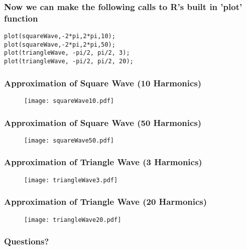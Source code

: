 \documentclass{beamer}
\begin{document}
\begin{frame}[fragile]
   \frametitle{Now we can make the following calls to R's built in 'plot' function}
   \begin{center}
   \begin{minipage}{100mm}
   \begin{lstlisting}
plot(squareWave,-2*pi,2*pi,10);
plot(squareWave,-2*pi,2*pi,50);
plot(triangleWave, -pi/2, pi/2, 3);
plot(triangleWave, -pi/2, pi/2, 20);
   \end{lstlisting}
   \end{minipage}
   \end{center}
\end{frame}

\begin{frame}[fragile]
   \frametitle{Approximation of Square Wave (10 Harmonics)}
   \begin{figure}
   \texttt{[image: squareWave10.pdf]}
   \end{figure}
\end{frame}

\begin{frame}[fragile]
   \frametitle{Approximation of Square Wave (50 Harmonics)}
   \begin{figure}
   \texttt{[image: squareWave50.pdf]}
   \end{figure}
\end{frame}

\begin{frame}[fragile]
   \frametitle{Approximation of Triangle Wave (3 Harmonics)}
   \begin{figure}
   \texttt{[image: triangleWave3.pdf]}
   \end{figure}
\end{frame}

\begin{frame}[fragile]
   \frametitle{Approximation of Triangle Wave (20 Harmonics)}
   \begin{figure}
   \texttt{[image: triangleWave20.pdf]}
   \end{figure}
\end{frame}

\begin{frame}[fragile]
   \frametitle{Questions?}
\end{frame}
\end{document}
